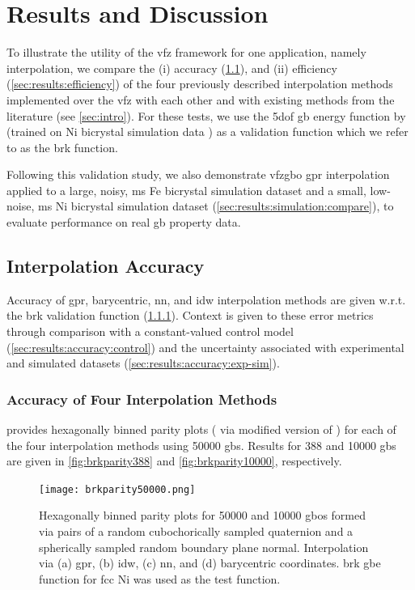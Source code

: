 \documentclass[final,twocolumn,12pt]{elsarticle}
\begin{document}
\section{Results and Discussion} \label{sec:results}

To illustrate the utility of the \gls{vfz} framework for one application, namely interpolation, we compare the (i) accuracy (\cref{sec:results:accuracy}), and (ii) efficiency (\cref{sec:results:efficiency}) of the four previously described interpolation methods implemented over the \gls{vfz} with each other and with existing methods from the literature (see \cref{sec:intro}). For these tests, we use the \gls{5dof} \gls{gb} energy function by \citet{bulatovGrainBoundaryEnergy2014} (trained on Ni bicrystal simulation data \cite{olmstedSurveyComputedGrain2009}) as a validation function which we refer to as the \gls{brk} function. 

Following this validation study, we also demonstrate \gls{vfzgbo} \gls{gpr} interpolation applied to a large, noisy, \gls{ms} Fe bicrystal simulation dataset \cite{kimPhasefieldModeling3D2014} and a small, low-noise, \gls{ms} Ni bicrystal simulation dataset \cite{olmstedSurveyComputedGrain2009} (\cref{sec:results:simulation:compare}), to evaluate performance on real \gls{gb} property data.

\subsection{Interpolation Accuracy}
\label{sec:results:accuracy}

Accuracy of \gls{gpr}, barycentric, \gls{nn}, and \gls{idw} interpolation methods are given w.r.t. the \gls{brk} validation function (\cref{sec:results:accuracy:interp}). Context is given to these error metrics through comparison with a constant-valued control model (\cref{sec:results:accuracy:control}) and the uncertainty associated with experimental and simulated datasets (\cref{sec:results:accuracy:exp-sim}).

\subsubsection{Accuracy of Four Interpolation Methods}
\label{sec:results:accuracy:interp}
 provides hexagonally binned parity plots ( via modified version of \cite{beanHexscatter2020}) for each of the four interpolation methods using \num{50000} \inpt{} \glspl{gb}. Results for \num{388} and \num{10000} \glspl{gb} are given in \cref{fig:brkparity388} and \cref{fig:brkparity10000}, respectively.
\begin{figure}[!ht]
    \centering
    \texttt{[image: brkparity50000.png]}
    \caption{Hexagonally binned parity plots for \num{50000} \inpt{} and \num{10000} \outpt{} \glspl{gbo} formed via pairs of a random cubochorically sampled quaternion and a spherically sampled random boundary plane normal. Interpolation via (a) \gls{gpr}, (b) \gls{idw}, (c) \gls{nn}, and (d) barycentric coordinates.  \gls{brk} \gls{gbe} function for \gls{fcc} Ni \cite{bulatovGrainBoundaryEnergy2014} was used as the test function.}
    \label{fig:brkparity50000}
\end{figure}
\end{document}
